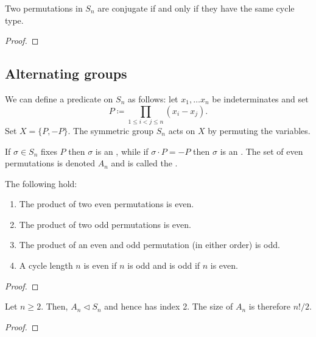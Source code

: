 \begin{theorem}
  Two permutations in \(S_{n}\) are conjugate if and only if they have the same cycle type.
\end{theorem}
\begin{proof}
\end{proof}

\subsection{Alternating groups}
We can define a predicate on \(S_{n}\) as follows: let \(x_{1}, \ldots x_{n}\) be indeterminates and set
\[P \coloneqq \prod_{1 \leq i < j \leq n} (x_{i} - x_{j}).\]
Set \(X = \{P, -P\}\). The symmetric group \(S_{n}\) acts on \(X\) by permuting the variables.

\begin{definition}
  If \(\sigma \in S_{n}\) fixes \(P\) then \(\sigma\) is an , while if \(\sigma \cdot P = -P\) then \(\sigma\) is an . The set of even permutations is denoted \(A_{n}\) and is called the .
\end{definition}



\begin{lemma}
  The following hold:
  \begin{enumerate}
  \item The product of two even permutations is even.
  \item The product of two odd permutations is even.
  \item The product of an even and odd permutation (in either order) is odd.
  \item A cycle length \(n\) is even if \(n\) is odd and is odd if \(n\) is even.
  \end{enumerate}
\end{lemma}
\begin{proof}
\end{proof}

\begin{theorem}
  Let \(n \geq 2\). Then, \(A_{n} \triangleleft S_{n}\) and hence has index 2. The size of \(A_{n}\) is therefore \(n! / 2\).
\end{theorem}

\begin{proof}
\end{proof}


